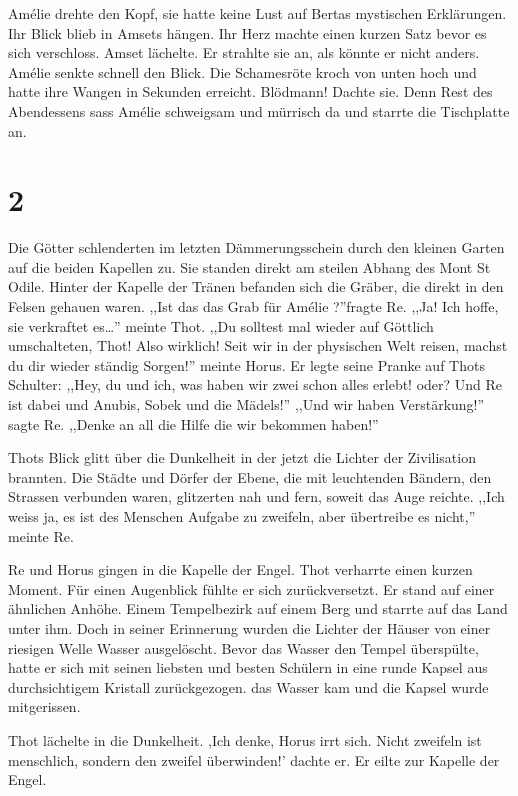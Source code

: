 \documentclass[11pt,titlepage,a5paper]{book}
\newcommand{\am}{Amélie }
\begin{document}
\am drehte den Kopf, sie hatte keine Lust auf Bertas mystischen Erklärungen. Ihr Blick blieb in Amsets hängen. Ihr Herz machte einen kurzen Satz bevor es sich verschloss. Amset lächelte. Er strahlte sie an, als könnte er nicht anders. \am senkte schnell den Blick. Die Schamesröte kroch von unten hoch und hatte ihre Wangen in Sekunden erreicht. Blödmann! Dachte sie. Denn Rest des Abendessens sass \am schweigsam und mürrisch da und starrte die Tischplatte an.

\section*{2}

Die Götter schlenderten im letzten Dämmerungsschein durch den kleinen Garten auf die beiden Kapellen zu. Sie standen direkt am steilen Abhang des Mont St Odile. Hinter der Kapelle der Tränen befanden sich die Gräber, die direkt in den Felsen gehauen waren. ,,Ist das das Grab für \am ?''fragte Re. ,,Ja! Ich hoffe, sie verkraftet es\dots '' meinte Thot. ,,Du solltest mal wieder auf Göttlich umschalteten, Thot! Also wirklich! Seit wir in der physischen Welt reisen, machst du dir wieder ständig Sorgen!'' meinte Horus. Er legte seine Pranke auf Thots Schulter: ,,Hey, du und ich, was haben wir zwei schon alles erlebt! oder? Und Re ist dabei und Anubis, Sobek und die Mädels!'' ,,Und wir haben Verstärkung!'' sagte Re. ,,Denke an all die Hilfe die wir bekommen haben!''

Thots Blick glitt über die Dunkelheit in der jetzt die Lichter der Zivilisation brannten. Die Städte und Dörfer der Ebene, die mit leuchtenden Bändern, den Strassen verbunden waren, glitzerten nah und fern, soweit das Auge reichte. ,,Ich weiss ja, es ist des Menschen Aufgabe zu zweifeln, aber übertreibe es nicht,'' meinte Re.

Re und Horus gingen in die Kapelle der Engel. Thot verharrte einen kurzen Moment. Für einen Augenblick fühlte er sich zurückversetzt. Er stand auf einer ähnlichen Anhöhe. Einem Tempelbezirk auf einem Berg und starrte auf das Land unter ihm. Doch in seiner Erinnerung wurden die Lichter der Häuser von einer riesigen Welle Wasser ausgelöscht. Bevor das Wasser den Tempel überspülte, hatte er sich mit seinen liebsten und besten Schülern in eine runde Kapsel aus durchsichtigem Kristall zurückgezogen. das Wasser kam und die Kapsel wurde mitgerissen. 

Thot lächelte in die Dunkelheit. ,Ich denke, Horus irrt sich. Nicht zweifeln ist menschlich, sondern den zweifel überwinden!' dachte er. Er eilte zur Kapelle der Engel.
\end{document}
